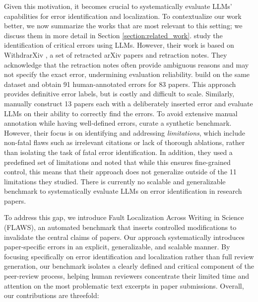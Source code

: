 \documentclass{article}
\newcommand{\benchmark}{FLAWS}
\begin{document}
Given this motivation, it becomes crucial to systematically evaluate LLMs' capabilities for error identification and localization. To contextualize our work better, we now summarize the works that are most relevant to this setting; we discuss them in more detail in Section \ref{section:related_work}. \citet{zhang2025} study the identification of critical errors using LLMs. However, their work is based on WithdrarXiv \citep{rao2024}, a set of retracted arXiv papers and retraction notes. They acknowledge that the retraction notes often provide ambiguous reasons and may not specify the exact error, undermining evaluation reliability. \citet{son2025} build on the same dataset and obtain 91 human-annotated errors for 83 papers. This approach provides definitive error labels, but is costly and difficult to scale. Similarly, \citet{liu2023} manually construct 13 papers each with a deliberately inserted error and evaluate LLMs on their ability to correctly find the errors. To avoid extensive manual annotation while having well-defined errors, \citet{xu2025llm} curate a synthetic benchmark. However, their focus is on identifying and addressing \emph{limitations}, which include non-fatal flaws such as irrelevant citations or lack of thorough ablations, rather than isolating the task of fatal error identification. In addition, they used a predefined set of limitations and noted that while this ensures fine-grained control, this means that their approach does not generalize outside of the 11 limitations they studied. There is currently no scalable and generalizable benchmark to systematically evaluate LLMs on error identification in research papers.

To address this gap, we introduce Fault Localization Across Writing in Science (\benchmark{}), an automated benchmark that inserts controlled modifications to invalidate the central claims of papers. Our approach systematically introduces paper-specific errors in an explicit, generalizable, and scalable manner. By focusing specifically on error identification and localization rather than full review generation, our benchmark isolates a clearly defined and critical component of the peer-review process, helping human reviewers concentrate their limited time and attention on the most problematic text excerpts in paper submissions. Overall, our contributions are threefold:
\end{document}
